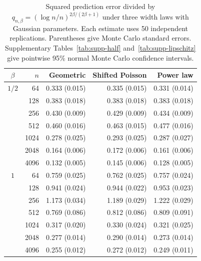 \begin{table}[htbp]
\caption{Squared prediction error divided by $q_{n,\beta}=(\log n/n)^{2\beta/(2\beta+1)}$ under three width laws with Gaussian parameters. Each estimate uses 50 independent replications. Parentheses give Monte Carlo standard errors. Supplementary Tables~\ref{tab:supp-half} and~\ref{tab:supp-lipschitz} give pointwise 95\% normal Monte Carlo confidence intervals.}
\label{tab:width-robustness}
\centering\small
\begin{tabular}{@{}crrrr@{}}
\toprule
$\beta$ & $n$ & Geometric & Shifted Poisson & Power law\\
\midrule
$1/2$ & 64 & 0.333 (0.015) & 0.335 (0.015) & 0.331 (0.014)\\
 & 128 & 0.383 (0.018) & 0.383 (0.018) & 0.383 (0.018)\\
 & 256 & 0.430 (0.009) & 0.429 (0.009) & 0.434 (0.009)\\
 & 512 & 0.460 (0.016) & 0.463 (0.015) & 0.477 (0.016)\\
 & 1024 & 0.278 (0.025) & 0.293 (0.025) & 0.287 (0.027)\\
 & 2048 & 0.164 (0.006) & 0.172 (0.006) & 0.161 (0.006)\\
 & 4096 & 0.132 (0.005) & 0.145 (0.006) & 0.128 (0.005)\\
\midrule
$1$ & 64 & 0.759 (0.025) & 0.762 (0.025) & 0.757 (0.024)\\
 & 128 & 0.941 (0.024) & 0.944 (0.022) & 0.953 (0.023)\\
 & 256 & 1.173 (0.034) & 1.189 (0.029) & 1.222 (0.029)\\
 & 512 & 0.769 (0.086) & 0.812 (0.086) & 0.809 (0.091)\\
 & 1024 & 0.317 (0.020) & 0.330 (0.024) & 0.321 (0.025)\\
 & 2048 & 0.277 (0.014) & 0.290 (0.014) & 0.273 (0.014)\\
 & 4096 & 0.255 (0.012) & 0.272 (0.012) & 0.249 (0.011)\\
\bottomrule
\end{tabular}
\end{table}
